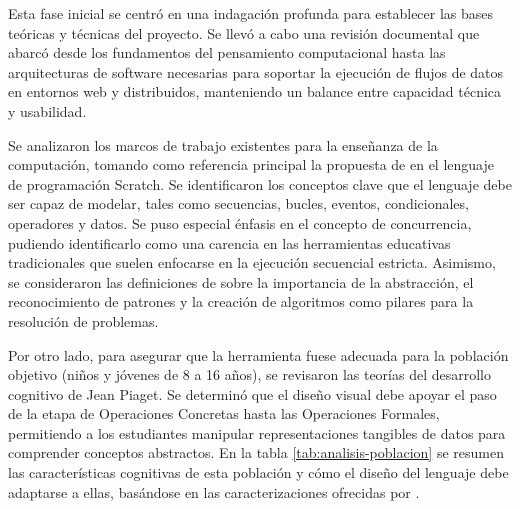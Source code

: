 
Esta fase inicial se centró en una indagación profunda para establecer las bases teóricas y técnicas del proyecto. Se llevó a cabo una revisión documental que abarcó desde los fundamentos del pensamiento computacional hasta las arquitecturas de software necesarias para soportar la ejecución de flujos de datos en entornos web y distribuidos, manteniendo un balance entre capacidad técnica y usabilidad.

Se analizaron los marcos de trabajo existentes para la enseñanza de la computación, tomando como referencia principal la propuesta de  en el lenguaje de programación Scratch. Se identificaron los conceptos clave que el lenguaje debe ser capaz de modelar, tales como secuencias, bucles, eventos, condicionales, operadores y datos. Se puso especial énfasis en el concepto de concurrencia, pudiendo identificarlo como una carencia en las herramientas educativas tradicionales que suelen enfocarse en la ejecución secuencial estricta. Asimismo, se consideraron las definiciones de  sobre la importancia de la abstracción, el reconocimiento de patrones y la creación de algoritmos como pilares para la resolución de problemas.

Por otro lado, para asegurar que la herramienta fuese adecuada para la población objetivo (niños y jóvenes de 8 a 16 años), se revisaron las teorías del desarrollo cognitivo de Jean Piaget. Se determinó que el diseño visual debe apoyar el paso de la etapa de Operaciones Concretas hasta las Operaciones Formales, permitiendo a los estudiantes manipular representaciones tangibles de datos para comprender conceptos abstractos. En la tabla \ref{tab:analisis-poblacion} se resumen las características cognitivas de esta población y cómo el diseño del lenguaje debe adaptarse a ellas, basándose en las caracterizaciones ofrecidas por .

